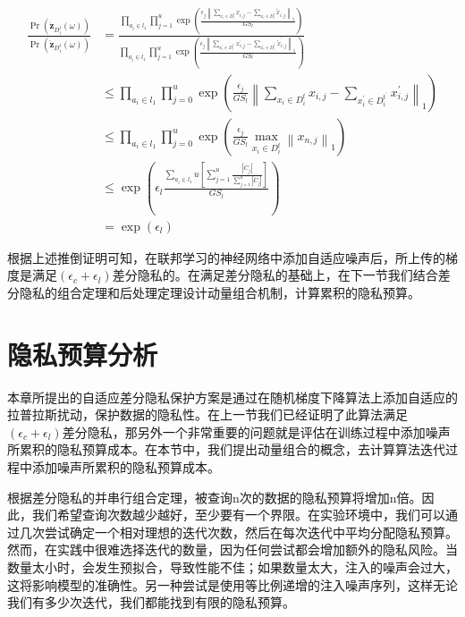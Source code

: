 \begin{equation}
\begin{aligned}
\frac{\operatorname{Pr}\left(\ddot{\mathbf{z}}_{D_{i}^{t}}(\omega)\right)}{\operatorname{Pr}\left(\ddot{\mathbf{z}}_{D_{i}^{t}}(\omega)\right)} &=\frac{\prod_{a_{i} \in l_{1}} \prod_{j=1}^{u} \exp \left(\frac{\epsilon_{j}\left\|\sum_{x_{i} \in D_{i}^{t}} x_{i, j}-\sum_{x_{i} \in D_{i}^{t}} \tilde{x}_{i, j}\right\|_{1}}{G S_{l}}\right)}{\prod_{a_{i} \in l_{1}} \prod_{j=1}^{u} \exp \left(\frac{\epsilon_{j}\left\|\sum_{x_{i}^{\prime} \in D_{i}^{t^{\prime}}} x_{i, j}^{\prime}-\sum_{x_{i}^{\prime} \in D_{i}^{t^{\prime}}} \tilde{x}_{i, j}^{\prime}\right\|_{1}}{G S_{l}}\right)} \\
& \leq \prod_{a_{i} \in l_{1}} \prod_{j=0}^{u} \exp \left(\frac{\epsilon_{j}}{G S_{l}}\left\|\sum_{x_{i} \in D_{i}^{t}} x_{i, j}-\sum_{x_{i}^{\prime} \in D_{i}^{t^{\prime}}} x_{i, j}^{\prime}\right\|_{1}\right) \\
& \leq \prod_{a_{i} \in l_{1}} \prod_{j=0}^{u} \exp \left(\frac{\epsilon_{j}}{G S_{l}} \max _{x_{i} \in D_{i}^{t}}\left\|x_{n, j}\right\|_{1}\right) \\
& \leq \exp \left(\epsilon_{l} \frac{\sum_{a_{i} \in l_{1}} u\left[\sum_{j=1}^{u} \frac{\left|\ddot{C}_{j}\right|}{\sum_{j=1}^{u}\left|\ddot{C}_{j}\right|}\right]}{G S_{l}}\right) \\
&=\exp \left(\epsilon_{l}\right)
\end{aligned}
\end{equation}

根据上述推倒证明可知，在联邦学习的神经网络中添加自适应噪声后，所上传的梯度是满足$\left(\epsilon_{c}+\epsilon_{l}\right)$差分隐私的。在满足差分隐私的基础上，在下一节我们结合差分隐私的组合定理和后处理定理设计动量组合机制，计算累积的隐私预算。

\section{隐私预算分析}
本章所提出的自适应差分隐私保护方案是通过在随机梯度下降算法上添加自适应的拉普拉斯扰动，保护数据的隐私性。在上一节我们已经证明了此算法满足$\left(\epsilon_{c}+\epsilon_{l}\right)$差分隐私，那另外一个非常重要的问题就是评估在训练过程中添加噪声所累积的隐私预算成本。在本节中，我们提出动量组合的概念，去计算算法迭代过程中添加噪声所累积的隐私预算成本。

根据差分隐私的并串行组合定理，被查询n次的数据的隐私预算将增加n倍。因此，我们希望查询次数越少越好，至少要有一个界限。在实验环境中，我们可以通过几次尝试确定一个相对理想的迭代次数，然后在每次迭代中平均分配隐私预算。然而，在实践中很难选择迭代的数量，因为任何尝试都会增加额外的隐私风险。当数量太小时，会发生预拟合，导致性能不佳；如果数量太大，注入的噪声会过大，这将影响模型的准确性。另一种尝试是使用等比例递增的注入噪声序列，这样无论我们有多少次迭代，我们都能找到有限的隐私预算。

